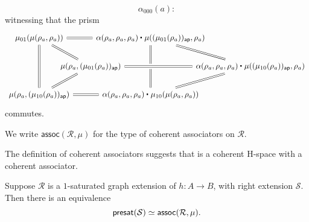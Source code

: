 \begin{defn}
\begin{enumerate}
\begin{equation*}
\alpha_{000}(a):
\end{equation*}
witnessing that the prism 
\begin{equation*}
\begin{tikzcd}[column sep=-2em]
\mu_{01}(\mu(\rho_a,\rho_a)) \arrow[rrr,equals] \arrow[dd,equals] \arrow[dr,equals] & & & \ct{\alpha(\rho_a,\rho_a,\rho_a)}{\mu((\mu_{01}(\rho_a))_{\mathsf{ap}},\rho_a)} \arrow[dr,equals] \arrow[dd,equals] \\
& \mu(\rho_a,(\mu_{01}(\rho_a))_{\mathsf{ap}}) \arrow[dl,equals] & & & \ct{\alpha(\rho_a,\rho_a,\rho_a)}{\mu((\mu_{10}(\rho_a))_{\mathsf{ap}},\rho_a)} \arrow[dl,equals] \arrow[from=lll,crossing over,equals] \\
\mu(\rho_a,(\mu_{10}(\rho_a))_{\mathsf{ap}}) \arrow[rrr,equals] & & & \ct{\alpha(\rho_a,\rho_a,\rho_a)}{\mu_{10}(\mu(\rho_a,\rho_a))}
\end{tikzcd}
\end{equation*}
commutes.
\end{enumerate}
We write $\mathsf{assoc}(\mathcal{R},\mu)$ for the type of coherent associators on $\mathcal{R}$.
\end{defn}

\begin{rmk}
The definition of coherent associators suggests that  is a coherent H-space with a coherent associator.
\end{rmk}

\begin{prp}
\label{lem:2presat_coh}
Suppose $\mathcal{R}$ is a $1$-saturated graph extension of $h:A\to B$, with right extension $\mathcal{S}$.
Then there is an equivalence
\begin{equation*}
\eqv{\mathsf{presat}(\mathcal{S})}{\mathsf{assoc}(\mathcal{R},\mu)}.
\end{equation*}
\end{prp}

